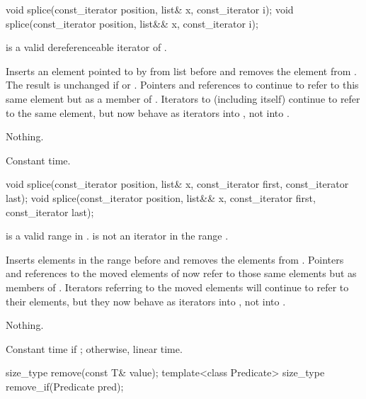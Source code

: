 %
\begin{itemdecl}
void splice(const_iterator position, list& x, const_iterator i);
void splice(const_iterator position, list&& x, const_iterator i);
\end{itemdecl}

\begin{itemdescr}
\pnum
\expects
{} is a valid dereferenceable iterator of .

\pnum
\effects
Inserts an element pointed to by
from list
before  and removes the element from
.
The result is unchanged if
or
.
Pointers and references to
continue to refer to this same element but as a member of
.
Iterators
to
(including
itself) continue to refer to the same element, but now behave as iterators into
,
not into
.

\pnum
\throws
Nothing.

\pnum
\complexity
Constant time.
\end{itemdescr}

%
\begin{itemdecl}
void splice(const_iterator position, list& x, const_iterator first,
            const_iterator last);
void splice(const_iterator position, list&& x, const_iterator first,
            const_iterator last);
\end{itemdecl}

\begin{itemdescr}
\pnum
\expects
\tcode{[first, last)} is a valid range in .
 is not an iterator in the range .

\pnum
\effects
Inserts elements in the range
before
and removes the elements from
.
Pointers and references to the moved elements of
now refer to those same elements but as members of
.
Iterators referring to the moved elements will continue to refer to their
elements, but they now behave as iterators into
,
not into
.

\pnum
\throws
Nothing.

\pnum
\complexity
Constant time if
;
otherwise, linear time.
\end{itemdescr}

%
\begin{itemdecl}
size_type remove(const T& value);
template<class Predicate> size_type remove_if(Predicate pred);
\end{itemdecl}

